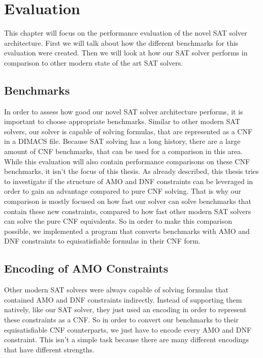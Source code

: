 
\chapter{Evaluation}
\label{ch:Evaluation}

This chapter will focus on the performance evaluation of the novel SAT solver architecture. First we will talk about how the different benchmarks for this evaluation were created. Then we will look at how our SAT solver performs in comparison to other modern state of the art SAT solvers.

\section{Benchmarks}

In order to assess how good our novel SAT solver architecture performs, it is important to choose appropriate benchmarks. Similar to other modern SAT solvers, our solver is capable of solving formulas, that are represented as a CNF in a DIMACS file. Because SAT solving has a long history, there are a large amount of CNF benchmarks, that can be used for a comparison in this area. While this evaluation will also contain performance comparisons on these CNF benchmarks, it isn't the focus of this thesis. As already described, this thesis tries to investigate if the structure of AMO and DNF constraints can be leveraged in order to gain an advantage compared to pure CNF solving. That is why our comparison is mostly focused on how fast our solver can solve benchmarks that contain these new constraints, compared to how fast other modern SAT solvers can solve the pure CNF equivalents. So in order to make this comparison possible, we implemented a program that converts benchmarks with AMO and DNF constraints to equisatisfiable formulas in their CNF form.

\section{Encoding of AMO Constraints}

Other modern SAT solvers were always capable of solving formulas that contained AMO and DNF constraints indirectly. Instead of supporting them natively, like our SAT solver, they just used an encoding in order to represent these constraints as a CNF. So in order to convert our benchmarks to their equisatisfiable CNF counterparts, we just have to encode every AMO and DNF constraint. This isn't a simple task because there are many different encodings that have different strengths.

